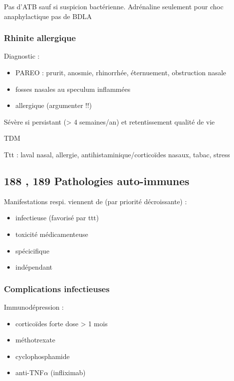\documentclass[11pt]{article}
\begin{document}
Pas d'ATB sauf si suspicion bactérienne. Adrénaline seulement pour choc anaphylactique
\danger pas de BDLA 

\subsubsection{Rhinite allergique}
\label{sec:org57b1c15}
Diagnostic :

\begin{itemize}
\item PAREO : prurit, anosmie, rhinorrhée, éternuement, obstruction nasale
\item fosses nasales au speculum inflammées
\item allergique (argumenter !!)
\end{itemize}

Sévère si persistant (> 4 semaines/an) et retentissement qualité de vie

TDM

Ttt : laval nasal, allergie, antihistaminique/corticoïdes nasaux, tabac, stress

\subsection{188 \textdagger{}, 189 Pathologies auto-immunes}
\label{sec:org4cb5e8c}
\label{sec:pathologies_auto_immunes}

Manifestations respi. viennent de (par priorité décroissante) :

\begin{itemize}
\item infectieuse (favorisé par ttt)
\item toxicité médicamenteuse
\item spécicifique
\item indépendant
\end{itemize}


\subsubsection{Complications infectieuses}
\label{sec:orgab2059d}
Immunodépression :

\begin{itemize}
\item corticoïdes forte dose > 1 mois
\item méthotrexate
\item cyclophosphamide
\item anti-TNF\(\alpha\) (infliximab)
\end{itemize}
\end{document}
